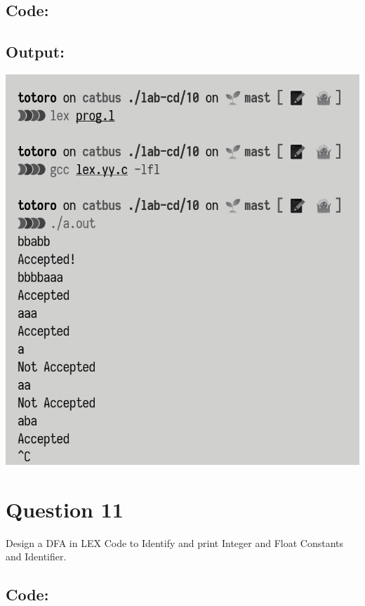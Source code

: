 \documentclass{article}
\begin{document}
\subsection*{Code:}

\newpage
\subsection*{Output:}
\begin{center}
  \includegraphics[width=14cm]{10/out.png}
\end{center}

\newpage
\section*{Question 11}
Design a DFA in LEX Code to Identify and print Integer and Float Constants and Identifier.
\subsection*{Code:}

\newpage
\end{document}
